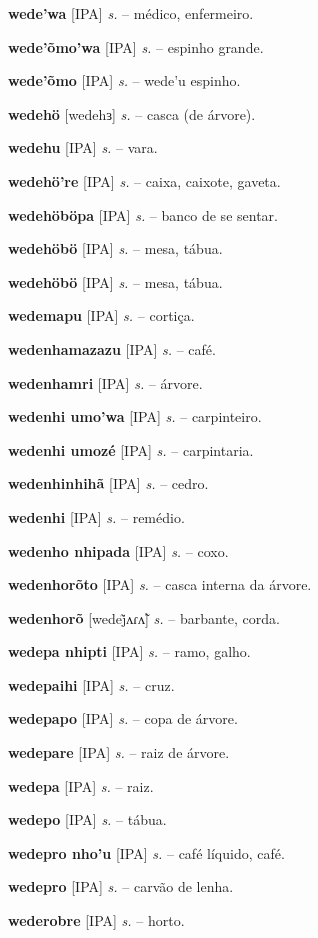 \textbf{wede'wa} [IPA] \textit{s.} -- médico, enfermeiro.

\textbf{wede'õmo'wa} [IPA] \textit{s.} -- espinho grande.

\textbf{wede'õmo} [IPA] \textit{s.} -- wede'u espinho.

\textbf{wedehö} [wedehɜ] \textit{s.} -- casca (de árvore).

\textbf{wedehu} [IPA] \textit{s.} -- vara.

\textbf{wedehö're} [IPA] \textit{s.} -- caixa, caixote, gaveta.

\textbf{wedehöböpa} [IPA] \textit{s.} -- banco de se sentar.

\textbf{wedehöbö} [IPA] \textit{s.} -- mesa, tábua.

\textbf{wedehöbö} [IPA] \textit{s.} -- mesa, tábua.

\textbf{wedemapu} [IPA] \textit{s.} -- cortiça.

\textbf{wedenhamazazu} [IPA] \textit{s.} -- café.

\textbf{wedenhamri} [IPA] \textit{s.} -- árvore.

\textbf{wedenhi umo'wa} [IPA] \textit{s.} -- carpinteiro.

\textbf{wedenhi umozé} [IPA] \textit{s.} -- carpintaria.

\textbf{wedenhinhihã} [IPA] \textit{s.} -- cedro.

\textbf{wedenhi} [IPA] \textit{s.} -- remédio.

\textbf{wedenho nhipada} [IPA] \textit{s.} -- coxo.

\textbf{wedenhorõto} [IPA] \textit{s.} -- casca interna da árvore.

\textbf{wedenhorõ} [wedej̃ʌɾʌ̃] \textit{s.} -- barbante, corda.

\textbf{wedepa nhipti} [IPA] \textit{s.} -- ramo, galho.

\textbf{wedepaihi} [IPA] \textit{s.} -- cruz.

\textbf{wedepapo} [IPA] \textit{s.} -- copa de árvore.

\textbf{wedepare} [IPA] \textit{s.} -- raiz de árvore.

\textbf{wedepa} [IPA] \textit{s.} -- raiz.

\textbf{wedepo} [IPA] \textit{s.} -- tábua.

\textbf{wedepro nho'u} [IPA] \textit{s.} -- café líquido, café.

\textbf{wedepro} [IPA] \textit{s.} -- carvão de lenha.

\textbf{wederobre} [IPA] \textit{s.} -- horto.


